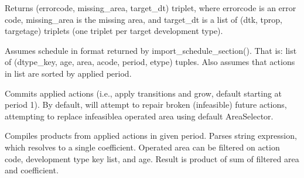 \documentclass[letterpaper,10pt,english]{sphinxmanual}
\begin{document}
\begin{fulllineitems}
\begin{fulllineitems}
Returns (errorcode, missing\_area, target\_dt) triplet, where errorcode is an error code, missing\_area is 
the missing area, and target\_dt is a list of (dtk, tprop, targetage) triplets (one triplet per target 
development type).

\end{fulllineitems}


\begin{fulllineitems}
\label{\detokenize{forest:forest.ForestModel.apply_schedule}}
Assumes schedule in format returned by import\_schedule\_section().
That is: list of (dtype\_key, age, area, acode, period, etype) tuples.
Also assumes that actions in list are sorted by applied period.

\end{fulllineitems}


\begin{fulllineitems}
\label{\detokenize{forest:forest.ForestModel.commit_actions}}
Commits applied actions (i.e., apply transitions and grow, default starting at period 1).
By default, will attempt to repair broken (infeasible) future actions, attempting to replace infeasiblea operated area using default AreaSelector.

\end{fulllineitems}


\begin{fulllineitems}
\label{\detokenize{forest:forest.ForestModel.compile_product}}
Compiles products from applied actions in given period. Parses string expression, which resolves to a single coefficient. 
Operated area can be filtered on action code, development type key list, and age. Result is product of sum of filtered 
area and coefficient.


\end{fulllineitems}
\end{fulllineitems}
\end{document}
